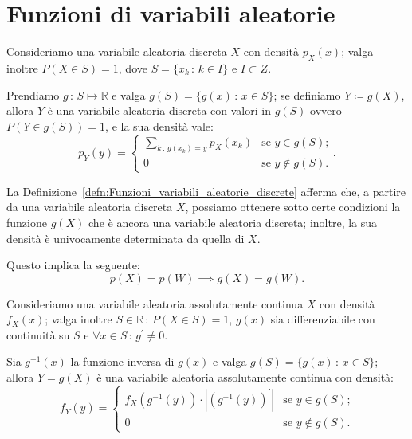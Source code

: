     \section{Funzioni di variabili aleatorie}
        \begin{defn}[discreta]\label{defn:Funzioni_variabili_aleatorie_discrete}
            Consideriamo una variabile aleatoria discreta $X$ con densità $p_X(x)$; valga inoltre $P(X \in S) = 1$, dove $S = \{x_k \,:\, k \in I\}$ e $I \subset Z$.

            Prendiamo $g\,:\, S \mapsto \mathbb{R}$ e valga $g(S) = \{g(x) \,:\, x \in S\}$; se definiamo $Y \coloneqq g(X)$, allora $Y$ è una variabile aleatoria discreta con valori in $g(S)$ ovvero $P(Y \in g(S)) = 1$, e la sua densità vale: \[
                p_Y(y) = \begin{cases}
                    \sum_{k \,:\, g(x_k) =y} p_X(x_k) & \text{se $y \in g(S)$;} \\
                    0 & \text{se $y \notin g(S)$.}
                \end{cases}
            .\]
        \end{defn}
        \begin{obsv}
            La Definizione~\ref{defn:Funzioni_variabili_aleatorie_discrete} afferma che, a partire da una variabile aleatoria discreta $X$, possiamo ottenere sotto certe condizioni la funzione $g(X)$ che è ancora una variabile aleatoria discreta; inoltre, la sua densità è univocamente determinata da quella di $X$.

            Questo implica la seguente: \[
                p(X) = p(W) \implies g(X) = g(W)
            .\] 
        \end{obsv}
        \begin{defn}[continua]\label{defn:Funzioni_variabili_aleatorie_continue}
            Consideriamo una variabile aleatoria assolutamente continua $X$ con densità $f_X(x)$; valga inoltre $S \in \mathbb{R} \,:\, P(X \in S) = 1$, $g(x)$ sia differenziabile con continuità su $S$ e $\forall x \in S \,:\, g^{\prime} \neq 0$.
            
            Sia $g^{-1}(x)$ la funzione inversa di $g(x)$ e valga $g(S) = \{g(x) \,:\, x \in S\}$; allora $Y = g(X)$ è una variabile aleatoria assolutamente continua con densità: \[
                f_Y(y) = \begin{cases}
                    f_X(g^{-1}(y)) \cdot \left|(g^{-1}(y))^{\prime}\right| & \text{se $y \in g(S)$;} \\
                    0 & \text{se $y \notin g(S)$.}
                \end{cases}
            \]
        \end{defn}
